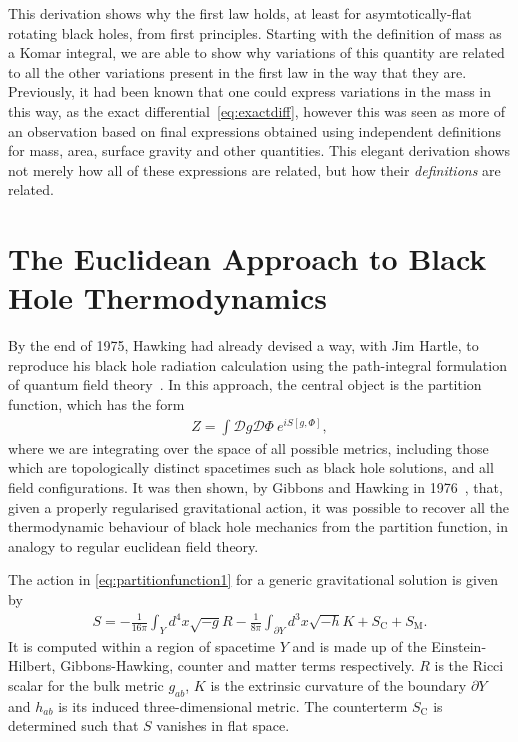 \documentclass[
twoside,
openright,
frontopenright,
]{dmathesis}
\begin{document}
This derivation shows why the first law holds, at least for asymtotically-flat
rotating black holes, from first principles. Starting with the definition of
mass as a Komar integral, we are able to show why variations of this quantity
are related to all the other variations present in the first law in the way that
they are. Previously, it had been known that one could express variations in the
mass in this way, as the exact differential~\eqref{eq:exactdiff}, however this
was seen as more of an observation based on final expressions obtained using
independent definitions for mass, area, surface gravity and other
quantities. This elegant derivation shows not merely how all of these
expressions are related, but how their \emph{definitions} are related.

\section{The Euclidean Approach to Black Hole Thermodynamics}
\label{sec:euclidean}

By the end of 1975, Hawking had already devised a way, with Jim Hartle, to
reproduce his black hole radiation calculation using the path-integral
formulation of quantum field theory~\cite{Hartle:1976tp}. In this approach, the
central object is the partition function, which has the form
\begin{align}
  \label{eq:partitionfunction1}
  Z = \int \mathcal{D}g \mathcal{D} \Phi~e^{iS[g,\Phi]},
\end{align}
where we are integrating over the space of all possible metrics, including those
which are topologically distinct spacetimes such as black hole solutions, and
all field configurations. It was then shown, by Gibbons and Hawking in
1976~\cite{Gibbons:1976ue}, that, given a properly regularised gravitational
action, it was possible to recover all the thermodynamic behaviour of black hole
mechanics from the partition function, in analogy to regular euclidean field
theory.

The action in \cref{eq:partitionfunction1} for a generic gravitational solution
is given by
\begin{align}
  S = -\frac{1}{16\pi}\int_Y d^4x \sqrt{-g} R - \frac{1}{8\pi}\int_{\partial
  Y}d^3x\sqrt{-h}K + S_\mathrm{C} + S_\mathrm{M}.
\end{align}
It is computed within a region of spacetime $Y$ and is made up of the
Einstein-Hilbert, Gibbons-Hawking, counter and matter terms respectively. $R$ is
the Ricci scalar for the bulk metric $g_{ab}$, $K$ is the extrinsic curvature of the
boundary $\partial Y$ and $h_{ab}$ is its induced three-dimensional metric. The
counterterm $S_\mathrm{C}$ is determined such that $S$ vanishes in flat space.
\end{document}
